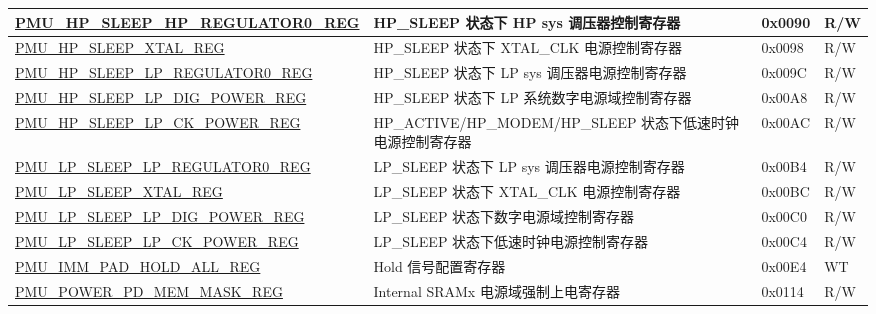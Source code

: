 \begin{longtable}{ | l | L{6cm} | l | l | }
\hyperref[regdesc:PMUHPSLEEPHPREGULATOR0REG]{PMU\_HP\_SLEEP\_HP\_REGULATOR0\_REG} & HP\_SLEEP 状态下 HP sys 调压器控制寄存器 & 0x0090 & R/W \\ \hline
\hyperref[regdesc:PMUHPSLEEPXTALREG]{PMU\_HP\_SLEEP\_XTAL\_REG} & HP\_SLEEP 状态下 XTAL\_CLK 电源控制寄存器 & 0x0098 & R/W \\ \hline
\hyperref[regdesc:PMUHPSLEEPLPREGULATOR0REG]{PMU\_HP\_SLEEP\_LP\_REGULATOR0\_REG} & HP\_SLEEP 状态下 LP sys 调压器电源控制寄存器 & 0x009C & R/W \\ \hline
\hyperref[regdesc:PMUHPSLEEPLPDIGPOWERREG]{PMU\_HP\_SLEEP\_LP\_DIG\_POWER\_REG} &  HP\_SLEEP 状态下 LP 系统数字电源域控制寄存器 & 0x00A8 & R/W \\ \hline
\hyperref[regdesc:PMUHPSLEEPLPCKPOWERREG]{PMU\_HP\_SLEEP\_LP\_CK\_POWER\_REG} & HP\_ACTIVE/HP\_MODEM/HP\_SLEEP 状态下低速时钟电源控制寄存器 & 0x00AC & R/W \\ \hline
\hyperref[regdesc:PMULPSLEEPLPREGULATOR0REG]{PMU\_LP\_SLEEP\_LP\_REGULATOR0\_REG} & LP\_SLEEP 状态下 LP sys 调压器电源控制寄存器 & 0x00B4 & R/W \\ \hline
\hyperref[regdesc:PMULPSLEEPXTALREG]{PMU\_LP\_SLEEP\_XTAL\_REG} & LP\_SLEEP 状态下 XTAL\_CLK 电源控制寄存器 & 0x00BC & R/W \\ \hline
\hyperref[regdesc:PMULPSLEEPLPDIGPOWERREG]{PMU\_LP\_SLEEP\_LP\_DIG\_POWER\_REG} & LP\_SLEEP 状态下数字电源域控制寄存器 & 0x00C0 & R/W \\ \hline
\hyperref[regdesc:PMULPSLEEPLPCKPOWERREG]{PMU\_LP\_SLEEP\_LP\_CK\_POWER\_REG} & LP\_SLEEP 状态下低速时钟电源控制寄存器 & 0x00C4 & R/W \\ \hline
\hyperref[regdesc:PMUIMMPADHOLDALLREG]{PMU\_IMM\_PAD\_HOLD\_ALL\_REG} & Hold 信号配置寄存器& 0x00E4 & WT \\ \hline
\hyperref[regdesc:PMUPOWERPDMEMMASKREG]{PMU\_POWER\_PD\_MEM\_MASK\_REG} & Internal SRAMx 电源域强制上电寄存器& 0x0114 & R/W \\ \hline


\end{longtable}
